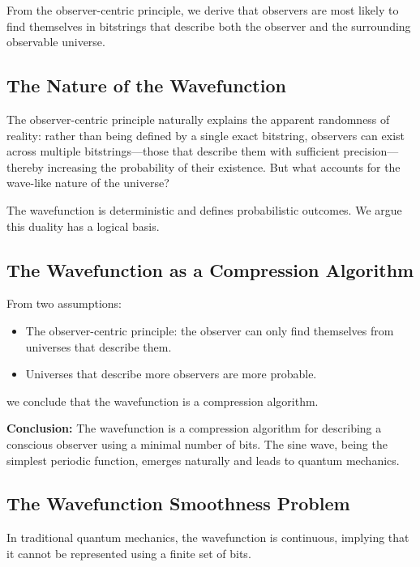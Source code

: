 \documentclass[11pt]{article}
\begin{document}
From the observer-centric principle, we derive that observers are most likely to find themselves in bitstrings that describe both the observer and the surrounding observable universe.



\subsection{The Nature of the Wavefunction}

The observer-centric principle naturally explains the apparent randomness of reality: rather than being defined by a single exact bitstring, observers can exist across multiple bitstrings—those that describe them with sufficient precision—thereby increasing the probability of their existence. But what accounts for the wave-like nature of the universe?

The wavefunction is deterministic and defines probabilistic outcomes. We argue this duality has a logical basis.

\subsection{The Wavefunction as a Compression Algorithm}

From two assumptions:

\begin{itemize}
      \item The observer-centric principle: the observer can only find themselves from universes that describe them.
      \item Universes that describe more observers are more probable.
\end{itemize}

we conclude that the wavefunction is a compression algorithm.

\textbf{Conclusion:} The wavefunction is a compression algorithm for describing a conscious observer using a minimal number of bits. The sine wave, being the simplest periodic function, emerges naturally and leads to quantum mechanics.



\subsection{The Wavefunction Smoothness Problem}

In traditional quantum mechanics, the wavefunction is continuous, implying that it cannot be represented using a finite set of bits.
\end{document}
